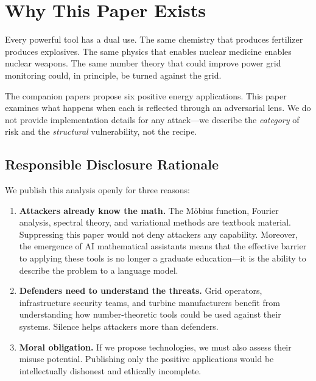 \documentclass[11pt,a4paper]{article}
\begin{document}
\section{Why This Paper Exists}

Every powerful tool has a dual use. The same chemistry that produces
fertilizer produces explosives. The same physics that enables
nuclear medicine enables nuclear weapons. The same number theory
that could improve power grid monitoring could, in principle, be
turned against the grid.

The companion papers propose six positive energy applications. This
paper examines what happens when each is reflected through an
adversarial lens. We do not provide implementation details for any
attack---we describe the \emph{category} of risk and the
\emph{structural} vulnerability, not the recipe.

\subsection{Responsible Disclosure Rationale}

We publish this analysis openly for three reasons:

\begin{enumerate}
  \item \textbf{Attackers already know the math.} The M\"obius
    function, Fourier analysis, spectral theory, and variational
    methods are textbook material. Suppressing this paper would not
    deny attackers any capability. Moreover, the emergence of AI
    mathematical assistants means that the effective barrier to
    applying these tools is no longer a graduate education---it is
    the ability to describe the problem to a language model.

  \item \textbf{Defenders need to understand the threats.} Grid
    operators, infrastructure security teams, and turbine
    manufacturers benefit from understanding how number-theoretic
    tools could be used against their systems. Silence helps
    attackers more than defenders.

  \item \textbf{Moral obligation.} If we propose technologies, we
    must also assess their misuse potential. Publishing only the
    positive applications would be intellectually dishonest and
    ethically incomplete.
\end{enumerate}
\end{document}
